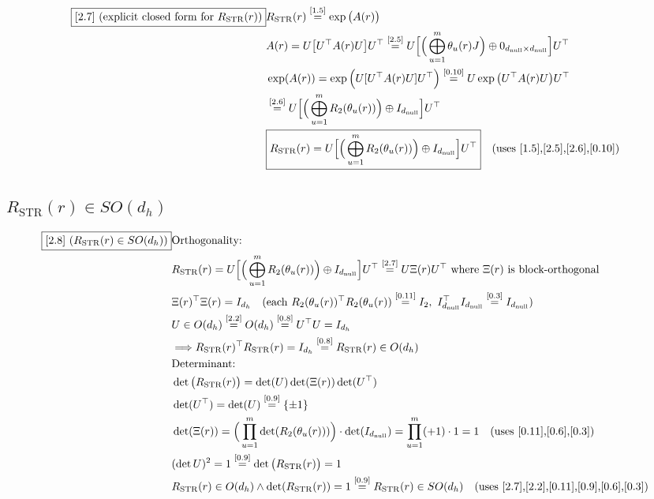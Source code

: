 \documentclass[11pt]{article}
\newcommand{\eqref}[1]{\overset{[#1]}{=}}
\begin{document}
\begin{align}
\boxed{[2.7] \text{ (explicit closed form for }R_{\mathrm{STR}}(r)\text{)}}
&R_{\mathrm{STR}}(r)
\eqref{1.5}
\exp\big(A(r)\big) \notag\\
&A(r)
=
U
\big[
U^\top A(r) U
\big]
U^\top
\eqref{2.5}
U
\Big[
\Big(
\bigoplus_{u=1}^{m}
\theta_u(r)J
\Big)
\oplus
0_{d_{\mathrm{null}}\times d_{\mathrm{null}}}
\Big]
U^\top \notag\\
&\exp(A(r))
=
\exp\Big(
U
[U^\top A(r) U]
U^\top
\Big)
\eqref{0.10}
U
\exp\big(
U^\top A(r) U
\big)
U^\top \notag\\
&\eqref{2.6}
U
\Big[
\Big(
\bigoplus_{u=1}^{m}
R_2(\theta_u(r))
\Big)
\oplus
I_{d_{\mathrm{null}}}
\Big]
U^\top \notag\\
&\boxed{
R_{\mathrm{STR}}(r)
=
U
\Big[
\Big(
\bigoplus_{u=1}^{m}
R_2(\theta_u(r))
\Big)
\oplus
I_{d_{\mathrm{null}}}
\Big]
U^\top
}
\quad(\text{uses [1.5],[2.5],[2.6],[0.10]})
\end{align}

\subsection{$R_{\mathrm{STR}}(r)\in SO(d_h)$}

\begin{align}
\boxed{[2.8] \text{ (}R_{\mathrm{STR}}(r)\in SO(d_h)\text{)}}
&\text{Orthogonality:} \notag\\
&R_{\mathrm{STR}}(r)
=
U
\Big[
\Big(
\bigoplus_{u=1}^{m}
R_2(\theta_u(r))
\Big)
\oplus
I_{d_{\mathrm{null}}}
\Big]
U^\top
\eqref{2.7}
U
\Xi(r)
U^\top
\text{ where }
\Xi(r)\text{ is block-orthogonal} \notag\\
&\Xi(r)^\top \Xi(r)
=
I_{d_h}
\quad
(\text{each }R_2(\theta_u(r))^\top R_2(\theta_u(r))
\eqref{0.11}I_2,\
I_{d_{\mathrm{null}}}^\top I_{d_{\mathrm{null}}}
\eqref{0.3}I_{d_{\mathrm{null}}}) \notag\\
&U\in O(d_h)
\eqref{2.2}
O(d_h)
\eqref{0.8}
U^\top U
=
I_{d_h} \notag\\
&\Longrightarrow
R_{\mathrm{STR}}(r)^\top R_{\mathrm{STR}}(r)
=
I_{d_h}
\eqref{0.8}
R_{\mathrm{STR}}(r)\in O(d_h) \notag\\
&\text{Determinant:} \notag\\
&\det\big(R_{\mathrm{STR}}(r)\big)
=
\det(U)
\det(\Xi(r))
\det(U^\top) \notag\\
&\det(U^\top)
=
\det(U)
\eqref{0.9}
\{\pm1\} \notag\\
&\det(\Xi(r))
=
\Big(
\prod_{u=1}^m
\det(R_2(\theta_u(r)))
\Big)
\cdot
\det(I_{d_{\mathrm{null}}})
=
\prod_{u=1}^m (+1)\cdot 1
=1
\quad(\text{uses [0.11],[0.6],[0.3]}) \notag\\
&(\det U)^2
=
1
\eqref{0.9}
\det\big(R_{\mathrm{STR}}(r)\big)
=
1 \notag\\
&R_{\mathrm{STR}}(r)\in O(d_h)
\wedge
\det(R_{\mathrm{STR}}(r))=1
\eqref{0.9}
R_{\mathrm{STR}}(r)
\in
SO(d_h)
\quad(\text{uses [2.7],[2.2],[0.11],[0.9],[0.6],[0.3]})
\end{align}
\end{document}
